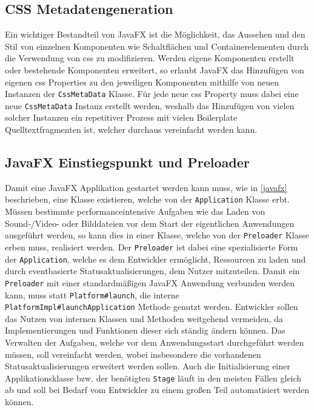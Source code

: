 \subsection{CSS Metadatengeneration}
Ein wichtiger Bestandteil von JavaFX ist die Möglichkeit, das Aussehen und den Stil von einzelnen Komponenten wie Schaltflächen und Containerelementen durch die Verwendung von \ac{css} zu modifizieren. Werden eigene Komponenten erstellt oder bestehende Komponenten erweitert, so erlaubt JavaFX das Hinzufügen von eigenen \ac{css} Properties zu den jeweiligen Komponenten mithilfe von neuen Instanzen der \texttt{CssMetaData} Klasse. Für jede neue \ac{css} Property muss dabei eine neue \texttt{CssMetaData} Instanz erstellt werden, weshalb das Hinzufügen von vielen solcher Instanzen ein repetitiver Prozess mit vielen Boilerplate Quelltextfragmenten ist, welcher durchaus vereinfacht werden kann.
\subsection{JavaFX Einstiegspunkt und Preloader}
Damit eine JavaFX Applikation gestartet werden kann muss, wie in \autoref{javafx} beschrieben, 
eine Klasse existieren, welche von der \texttt{Application} Klasse erbt. Müssen bestimmte performanceintensive Aufgaben wie das Laden von Sound-/Video- oder Bilddateien vor dem Start der eigentlichen Anwendungen ausgeführt werden, so kann dies in einer Klasse, welche von der \texttt{Preloader} Klasse erben muss, realisiert werden. Der \texttt{Preloader} ist dabei eine spezialisierte Form der \texttt{Application}, welche es dem Entwickler ermöglicht, Ressourcen zu laden und durch eventbasierte Statusaktualisierungen, dem Nutzer mitzuteilen. Damit ein \texttt{Preloader} mit einer standardmäßigen JavaFX Anwendung verbunden werden kann, muss statt \texttt{Platform\#launch}, die interne \texttt{PlatformImpl\#launchApplication} Methode genutzt werden. Entwickler sollen das Nutzen von internen Klassen und Methoden weitgehend vermeiden, da Implementierungen und Funktionen dieser sich ständig ändern können. Das Verwalten der Aufgaben, welche vor dem Anwendungsstart durchgeführt werden müssen, soll vereinfacht werden, wobei insbesondere die vorhandenen Statusaktualisierungen erweitert werden sollen. Auch die Initialisierung einer Applikationsklasse bzw. der benötigten \texttt{Stage} läuft in den meisten Fällen gleich ab und soll bei Bedarf vom Entwickler zu einem großen Teil automatisiert werden können.
